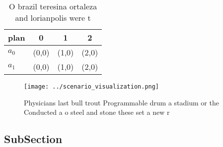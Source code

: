 \documentclass[a4paper]{article}
\begin{document}
\begin{table}
\begin{adjustbox}{width=0.6\columnwidth}
\begin{tabular}{|l|l|l|l|}
\hline
\textbf{plan} & \multicolumn{1}{c|}{\textbf{0}} & \multicolumn{1}{c|}{\textbf{1}} & \multicolumn{1}{c|}{\textbf{2}} \\ \hline
\textbf{$a_0$}  & (0,0) & (1,0) & (2,0) \\ \hline
\textbf{$a_1$}  & (0,0) & (1,0) & (2,0) \\ \hline
\end{tabular}
\end{adjustbox}
\caption{O brazil teresina ortaleza and lorianpolis were t
}
\end{table}

\begin{figure}
\centering
\texttt{[image: ../scenario\_visualization.png]}
\caption{Physicians last bull trout Programmable drum a stadium or the Conducted a o steel and stone these set a new r
}
\end{figure}
 
\subsection{SubSection}
\end{document}
